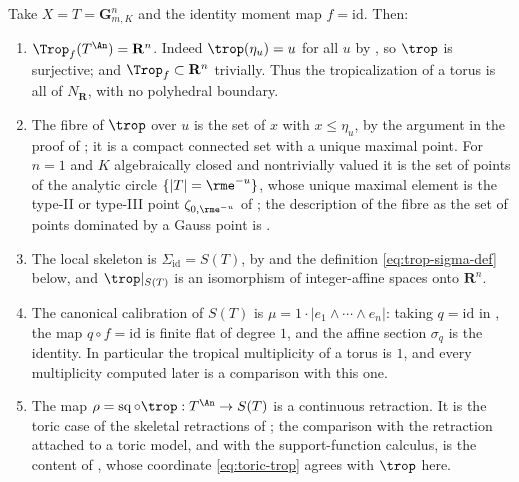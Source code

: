 \begin{example}
\label{ex:trop-torus-explicit}
Take $X=T=\mathbf G_{m,K}^n$ and the identity moment map $f=\mathrm{id}$.
Then:
\begin{enumerate}
\item $\Trop_f(T^{\An})=\mathbf R^n$. Indeed $\trop(\eta_u)=u$ for all $u$
  by , so $\trop$ is surjective; and
  $\Trop_f\subset\mathbf R^n$ trivially. Thus the tropicalization of a
  torus is all of $N_{\mathbf R}$, with no polyhedral boundary.
\item The fibre of $\trop$ over $u$ is the set of $x$ with $x\le\eta_u$,
  by the argument in the proof of ; it is a
  compact connected set with a unique maximal point. For $n=1$ and
  $K$ algebraically closed and nontrivially valued it is the set of points
  of the analytic circle $\{|T|=\rme^{-u}\}$, whose unique maximal element
  is the type-II or type-III point $\zeta_{0,\rme^{-u}}$ of
  ; the description of the fibre as the set
  of points dominated by a Gauss point is .
\item The local skeleton is $\Sigma_{\mathrm{id}}=S(T)$, by
   and the definition
  \eqref{eq:trop-sigma-def} below, and $\trop|_{S(T)}$ is an isomorphism of
  integer-affine spaces onto $\mathbf R^n$.
\item The canonical calibration of $S(T)$ is
  $\mu=1\cdot|e_1\wedge\cdots\wedge e_n|$: taking $q=\mathrm{id}$ in
  , the map $q\circ f=\mathrm{id}$ is
  finite flat of degree $1$, and the affine section $\sigma_q$ is the
  identity. In particular the tropical multiplicity of a torus is $1$, and
  every multiplicity computed later is a comparison with this one.
\item The map $\rho=\sq\circ\trop:T^{\An}\to S(T)$ is a continuous
  retraction. It is the toric case of the skeletal retractions of
  ; the comparison with the retraction
  attached to a toric model, and with the support-function calculus, is the
  content of , whose coordinate
  \eqref{eq:toric-trop} agrees with $\trop$ here.
\end{enumerate}
\end{example}

